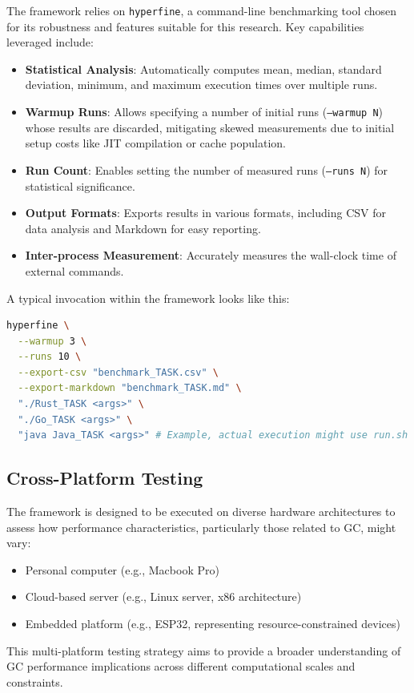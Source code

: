 \documentclass{article}
\begin{document}
The framework relies on \texttt{hyperfine}, a command-line benchmarking tool chosen for its robustness and features suitable for this research. Key capabilities leveraged include:
\begin{itemize}
    \item \textbf{Statistical Analysis}: Automatically computes mean, median, standard deviation, minimum, and maximum execution times over multiple runs.
    \item \textbf{Warmup Runs}: Allows specifying a number of initial runs (\texttt{--warmup N}) whose results are discarded, mitigating skewed measurements due to initial setup costs like JIT compilation or cache population.
    \item \textbf{Run Count}: Enables setting the number of measured runs (\texttt{--runs N}) for statistical significance.
    \item \textbf{Output Formats}: Exports results in various formats, including CSV for data analysis and Markdown for easy reporting.
    \item \textbf{Inter-process Measurement}: Accurately measures the wall-clock time of external commands.
\end{itemize}
A typical invocation within the framework looks like this:
\begin{lstlisting}[language=bash, caption={Example hyperfine usage in benchmark.sh }, style=shstyle]
hyperfine \
  --warmup 3 \
  --runs 10 \
  --export-csv "benchmark_TASK.csv" \
  --export-markdown "benchmark_TASK.md" \
  "./Rust_TASK <args>" \
  "./Go_TASK <args>" \
  "java Java_TASK <args>" # Example, actual execution might use run.sh
\end{lstlisting}

\subsection{Cross-Platform Testing} %

The framework is designed to be executed on diverse hardware architectures to assess how performance characteristics, particularly those related to GC, might vary:
\begin{itemize}
    \item Personal computer (e.g., Macbook Pro) 
    \item Cloud-based server (e.g., Linux server, x86 architecture) 
    \item Embedded platform (e.g., ESP32, representing resource-constrained devices) 
\end{itemize}
This multi-platform testing strategy aims to provide a broader understanding of GC performance implications across different computational scales and constraints.
\end{document}
